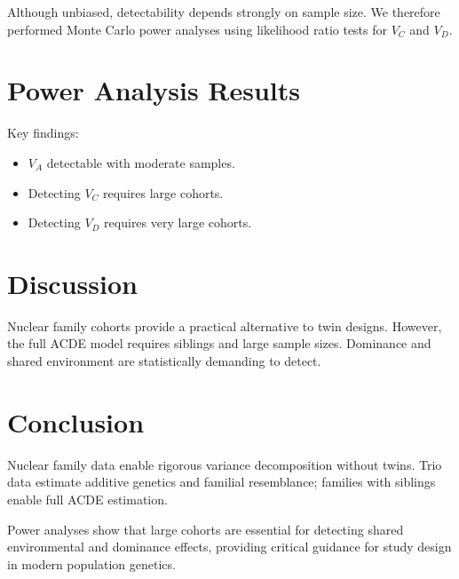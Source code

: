 \documentclass[12pt]{article}
\begin{document}
Although unbiased, detectability depends strongly on sample size.
We therefore performed Monte Carlo power analyses using likelihood ratio
tests for $V_C$ and $V_D$.

\section{Power Analysis Results}

Key findings:

\begin{itemize}
\item $V_A$ detectable with moderate samples.
\item Detecting $V_C$ requires large cohorts.
\item Detecting $V_D$ requires very large cohorts.
\end{itemize}

\section{Discussion}

Nuclear family cohorts provide a practical alternative to twin designs.
However, the full ACDE model requires siblings and large sample sizes.
Dominance and shared environment are statistically demanding to detect.

\section{Conclusion}

Nuclear family data enable rigorous variance decomposition without twins.
Trio data estimate additive genetics and familial resemblance; families
with siblings enable full ACDE estimation.

Power analyses show that large cohorts are essential for detecting
shared environmental and dominance effects, providing critical guidance
for study design in modern population genetics.
\end{document}
